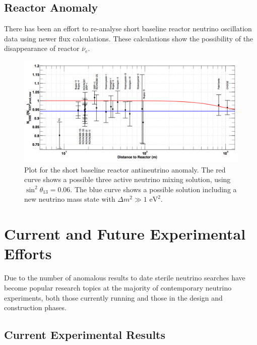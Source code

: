 \documentclass[aps,prd,twocolumn,nofootinbib]{revtex4-1}
\begin{document}
\subsection{Reactor Anomaly}
There has been an effort to re-analyse short baseline reactor neutrino oscillation data using newer flux calculations. These calculations show the possibility of the disappearance of reactor $\overline{\nu}_e$.
\begin{figure}[H]
  \centering
  \includegraphics[width=1\columnwidth]{../figures/reactor_anom.png}
  \caption{Plot for the short baseline reactor antineutrino anomaly. The red curve shows a possible three active neutrino mixing solution, using $\sin^2\theta_{13} = 0.06$. The blue curve shows a possible solution including a new neutrino mass state with $\Delta m^2 \gg 1\text{ eV}^2$.}
\end{figure}

\section{Current and Future Experimental Efforts}
Due to the number of anomalous results to date sterile neutrino searches have become popular research topics at the majority of contemporary neutrino experiments, both those currently running and those in the design and construction phases.

\subsection{Current Experimental Results}
\end{document}
